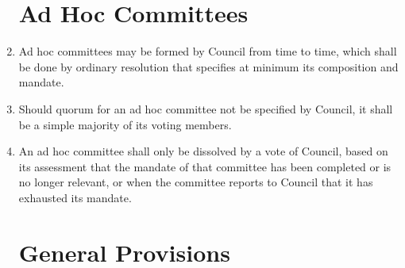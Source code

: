 \documentclass[oneside]{book}
\begin{document}
\begin{enumerate}
\section{\label{Ad_Hoc_Committees}Ad Hoc Committees }
\item Ad hoc committees may be formed by Council from time to time, which shall
be done by ordinary resolution that specifies at minimum its composition and mandate.
\item Should quorum for an ad hoc committee not be specified by Council, it shall be a simple majority of its voting members. 
\item An ad hoc committee shall only be dissolved by a vote of Council, based on its assessment that the mandate of that committee has been completed or is no longer relevant, or when the committee reports to Council that it has exhausted its mandate. 

\section{\label{Committees_General_Provisions}General Provisions }


\end{enumerate}
\end{document}
